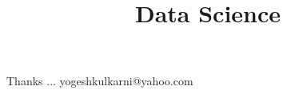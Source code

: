 \documentclass[xcolor=dvipsnames,compress,t,pdf,9pt]{beamer}
\title[\insertframenumber /\inserttotalframenumber]{Data Science}
\begin{document}
	\begin{frame}
	\titlepage
	\end{frame}
%	
%	
	

	\begin{frame}[c]{}
	Thanks ...
	\vspace{5mm}
	yogeshkulkarni@yahoo.com
	\end{frame}
\end{document}
